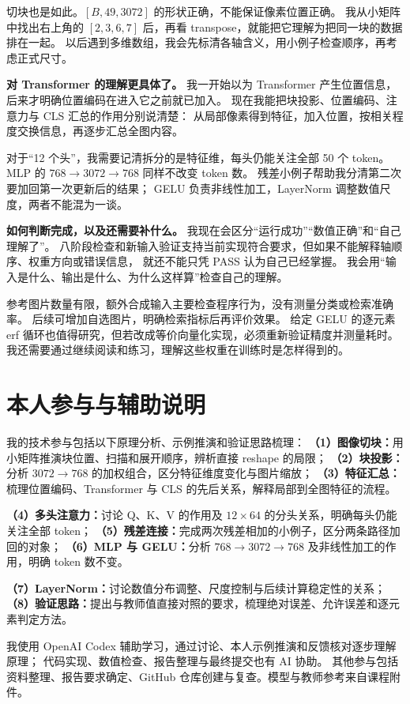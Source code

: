 \documentclass[a4paper,12pt]{article}
\begin{document}
切块也是如此。$[B,49,3072]$ 的形状正确，不能保证像素位置正确。
我从小矩阵中找出右上角的 $[2,3,6,7]$ 后，再看 transpose，就能把它理解为把同一块的数据排在一起。
以后遇到多维数组，我会先标清各轴含义，用小例子检查顺序，再考虑正式尺寸。

\noindent\textbf{对 Transformer 的理解更具体了。}
我一开始以为 Transformer 产生位置信息，后来才明确位置编码在进入它之前就已加入。
现在我能把块投影、位置编码、注意力与 CLS 汇总的作用分别说清楚：
从局部像素得到特征，加入位置，按相关程度交换信息，再逐步汇总全图内容。

对于“12 个头”，我需要记清拆分的是特征维，每头仍能关注全部 50 个 token。
MLP 的 $768\to3072\to768$ 同样不改变 token 数。
残差小例子帮助我分清第二次要加回第一次更新后的结果；
GELU 负责非线性加工，LayerNorm 调整数值尺度，两者不能混为一谈。

\noindent\textbf{如何判断完成，以及还需要补什么。}
我现在会区分“运行成功”“数值正确”和“自己理解了”。
八阶段检查和新输入验证支持当前实现符合要求，但如果不能解释轴顺序、权重方向或错误信息，
就还不能只凭 PASS 认为自己已经掌握。
我会用“输入是什么、输出是什么、为什么这样算”检查自己的理解。

参考图片数量有限，额外合成输入主要检查程序行为，没有测量分类或检索准确率。
后续可增加自选图片，明确检索指标后再评价效果。
给定 GELU 的逐元素 erf 循环也值得研究，但若改成等价向量化实现，必须重新验证精度并测量耗时。
我还需要通过继续阅读和练习，理解这些权重在训练时是怎样得到的。

\section{本人参与与辅助说明}
我的技术参与包括以下原理分析、示例推演和验证思路梳理：
\textbf{（1）图像切块：}用小矩阵推演块位置、扫描和展开顺序，辨析直接 reshape 的局限；
\textbf{（2）块投影：}分析 $3072\to768$ 的加权组合，区分特征维度变化与图片缩放；
\textbf{（3）特征汇总：}梳理位置编码、Transformer 与 CLS 的先后关系，解释局部到全图特征的流程。

\textbf{（4）多头注意力：}讨论 Q、K、V 的作用及 $12\times64$ 的分头关系，明确每头仍能关注全部 token；
\textbf{（5）残差连接：}完成两次残差相加的小例子，区分两条路径加回的对象；
\textbf{（6）MLP 与 GELU：}分析 $768\to3072\to768$ 及非线性加工的作用，明确 token 数不变。

\textbf{（7）LayerNorm：}讨论数值分布调整、尺度控制与后续计算稳定性的关系；
\textbf{（8）验证思路：}提出与教师值直接对照的要求，梳理绝对误差、允许误差和逐元素判定方法。

我使用 OpenAI Codex 辅助学习，通过讨论、本人示例推演和反馈核对逐步理解原理；
代码实现、数值检查、报告整理与最终提交也有 AI 协助。
其他参与包括资料整理、报告要求确定、GitHub 仓库创建与复查。模型与教师参考来自课程附件。
\end{document}
